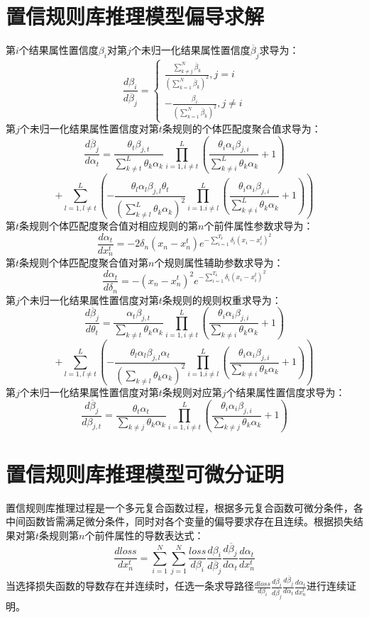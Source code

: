 \documentclass{cjc}
\begin{document}
\appendix

\section{置信规则库推理模型偏导求解}
\label{Appendix A}
第$i$个结果属性置信度$\beta_i$对第$j$个未归一化结果属性置信度$\overline{\beta}_j$求导为：
$$\frac{d\beta_i}{d\overline{\beta}_j}=
    \left\{
    \begin{aligned}
        \frac{\sum_{k\neq j}^N\overline{\beta}_k}{(\sum_{k=1}^N\overline{\beta}_k)^2},j=i \\
        -\frac{\beta_i}{(\sum_{k=1}^N\overline{\beta}_k)^2},j\neq i
    \end{aligned}
    \right.$$
第$j$个未归一化结果属性置信度对第$t$条规则的个体匹配度聚合值求导为：
$$\frac{d\overline{\beta}_j}{d\alpha_t}=\frac{\theta_t\beta_{j,t}}{\sum_{k\neq t}^L\theta_k\alpha_k}\prod_{i=1,i\neq t}^L(\frac{\theta_i\alpha_i\beta_{j,i}}{\sum_{k\neq i}^L{\theta_k\alpha_k}}+1)$$
$$+\sum_{l=1,l\neq t}^L(-\frac{\theta_l\alpha_l\beta_{j,l}\theta_t}{(\sum_{k\neq l}^L\theta_k\alpha_k)^2}\prod_{i=1.i\neq l}^L(\frac{\theta_i\alpha_i\beta_{j,i}}{\sum_{k\neq i}^L{\theta_k\alpha_k}}+1))$$
第$t$条规则个体匹配度聚合值对相应规则的第$n$个前件属性参数求导为：
$$\frac{d\alpha_t}{dx_n^t}=-2\delta_n(x_n-x_n^t)e^{-\sum_{i=1}^{T_k}\delta_i(x_i-x_i^t)^2}$$
第$t$条规则个体匹配度聚合值对第$n$个规则属性辅助参数求导为：
$$\frac{d\alpha_t}{d\delta_n}=-(x_n-x_n^t)^{2}e^{-\sum_{i=1}^{T_k}\delta_i(x_i-x_i^t)^2}$$
第$j$个未归一化结果属性置信度对第$t$条规则的规则权重求导为：
$$\frac{d\overline{\beta}_j}{d\theta_t}=\frac{\alpha_t\beta_{j,t}}{\sum_{k\neq t}\theta_k\alpha_k}\prod_{i=1,i\neq t}^L(\frac{\theta_i\alpha_i\beta_{j,i}}{\sum_{k\neq i}{\theta_k\alpha_k}}+1)$$
$$+\sum_{l=1,l\neq t}^L(-\frac{\theta_l\alpha_l\beta_{j,l}\alpha_t}{(\sum_{k\neq l}\theta_k\alpha_k)^2}\prod_{i=1.i\neq l}^L(\frac{\theta_i\alpha_i\beta_{j,i}}{\sum_{k\neq i}{\theta_k\alpha_k}}+1))$$
第$j$个未归一化结果属性置信度对第$t$条规则对应第$j$个结果属性置信度求导为：
$$\frac{d\overline{\beta}_j}{d\beta_{j,t}}=\frac{\theta_t\alpha_t}{\sum_{k\neq j}\theta_k\alpha_k}\prod_{i=1,i\neq t}^L(\frac{\theta_i\alpha_i\beta_{j,i}}{\sum_{k\neq j}\theta_k\alpha_k}+1)$$

\section{置信规则库推理模型可微分证明}
\label{Appendix B}
置信规则库推理过程是一个多元复合函数过程，根据多元复合函数可微分条件，各中间函数皆需满足微分条件，同时对各个变量的偏导要求存在且连续。根据损失结果对第$t$条规则第$n$个前件属性的导数表达式：
$$\frac{dloss}{dx_n^t}=\sum_{i=1}^N\sum_{j=1}^N \frac{loss}{d\beta_i}\frac{d\beta_i}{d\overline{\beta}_j}\frac{d\overline{\beta}_j}{d\alpha_t}\frac{d\alpha_t}{dx_n^t}$$
当选择损失函数的导数存在并连续时，任选一条求导路径$\frac{dloss}{d\beta_i}\frac{d\beta_i}{d\overline{\beta}_j}\frac{d\overline{\beta}_j}{d\alpha_t}\frac{d\alpha_t}{dx_n^t}$进行连续证明。
\end{document}
